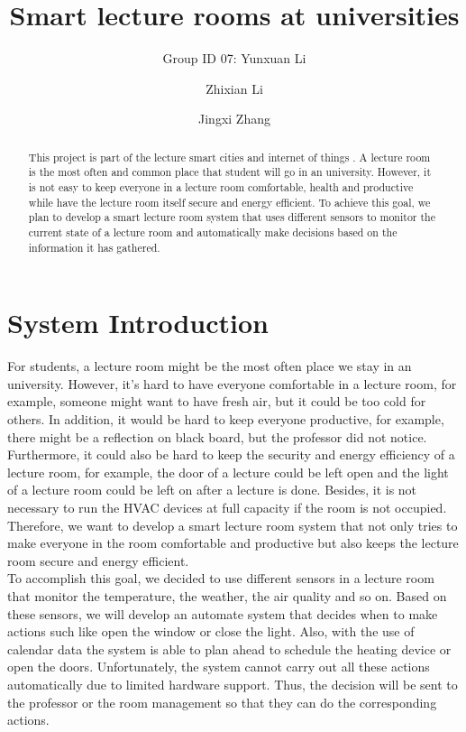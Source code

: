\documentclass[runningheads]{llncs}
\begin{document}
%
\title{Smart lecture rooms at universities}

\author{Group ID 07: Yunxuan Li \and
Zhixian Li \and
Jingxi Zhang}

%
\maketitle              %
%
\begin{abstract}
This project is part of the lecture smart cities and internet of things \cite{ref_url1}. A lecture room is the most often and common place that student will go in an university. However, it is not easy to keep everyone in a lecture room comfortable, health and productive while have the lecture room itself secure and energy efficient. To achieve this goal, we plan to develop a smart lecture room system that uses different sensors to monitor the current state of a lecture room and automatically make decisions based on the information it has gathered.

\end{abstract}
%
%
%
\section{System Introduction}
For students, a lecture room might be the most often place we stay in an university. However, it’s hard to have everyone comfortable in a lecture room, for example, someone might want to have fresh air, but it could be too cold for others. In addition, it would be hard to keep everyone productive, for example, there might be a reflection on black board, but the professor did not notice. Furthermore, it could also be hard to keep the security and energy efficiency of a lecture room, for example, the door of a lecture could be left open and the light of a lecture room could be left on after a lecture is done. Besides, it is not necessary to run the HVAC devices at full capacity if the room is not occupied. Therefore, we want to develop a smart lecture room system that not only tries to make everyone in the room comfortable and productive but also keeps the lecture room secure and energy efficient. \\
To accomplish this goal, we decided to use different sensors in a lecture room that monitor the temperature, the weather, the air quality and so on. Based on these sensors, we will develop an automate system that decides when to make actions such like open the window or close the light. Also, with the use of calendar data the system is able to plan ahead to schedule the heating device or open the doors. Unfortunately, the system cannot carry out all these actions automatically due to limited hardware support. Thus, the decision will be sent to the professor or the room management so that they can do the corresponding actions.
\end{document}
